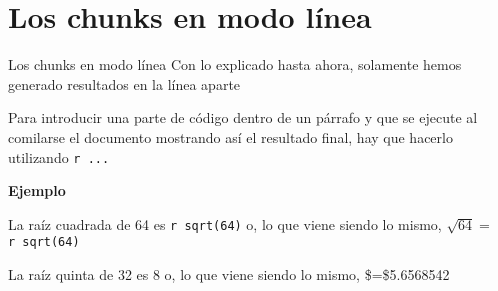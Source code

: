 \documentclass[
  ignorenonframetext,
]{beamer}
\begin{document}
\hypertarget{los-chunks-en-modo-luxednea}{%
\section{Los chunks en modo línea}\label{los-chunks-en-modo-luxednea}}

\begin{frame}[fragile]{Los chunks en modo línea}
\protect\hypertarget{los-chunks-en-modo-luxednea-1}{}
Con lo explicado hasta ahora, solamente hemos generado resultados en la
línea aparte

Para introducir una parte de código dentro de un párrafo y que se
ejecute al comilarse el documento mostrando así el resultado final, hay
que hacerlo utilizando \texttt{\textasciigrave{}r\ ...\textasciigrave{}}

\textbf{Ejemplo}

La raíz cuadrada de 64 es
\texttt{\textasciigrave{}r\ sqrt(64)\textasciigrave{}} o, lo que viene
siendo lo mismo,
\(\sqrt{64}=\)\texttt{\textasciigrave{}r\ sqrt(64)\textasciigrave{}}

La raíz quinta de 32 es 8 o, lo que viene siendo lo mismo,
\$=\$5.6568542
\end{frame}
\end{document}

